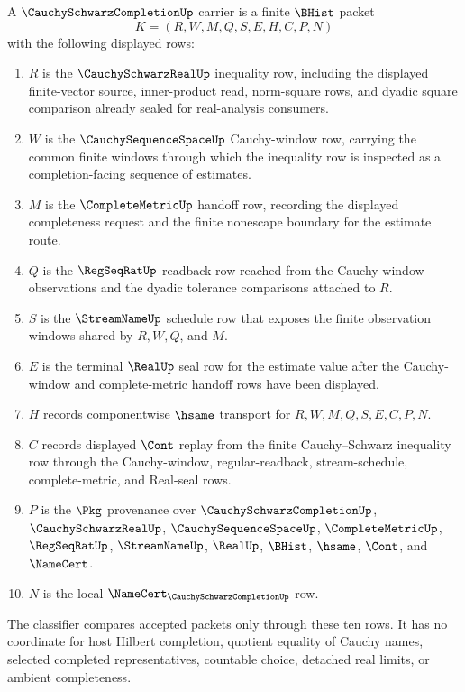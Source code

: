 \begin{definition}
\label{def:cauchy-schwarz-completion-carrier}
A $\CauchySchwarzCompletionUp$ carrier is a finite $\BHist$ packet
$$
K=(R,W,M,Q,S,E,H,C,P,N)
$$
with the following displayed rows:
\begin{enumerate}
\item $R$ is the $\CauchySchwarzRealUp$ inequality row, including the displayed finite-vector source, inner-product read, norm-square rows, and dyadic square comparison already sealed for real-analysis consumers.
\item $W$ is the $\CauchySequenceSpaceUp$ Cauchy-window row, carrying the common finite windows through which the inequality row is inspected as a completion-facing sequence of estimates.
\item $M$ is the $\CompleteMetricUp$ handoff row, recording the displayed completeness request and the finite nonescape boundary for the estimate route.
\item $Q$ is the $\RegSeqRatUp$ readback row reached from the Cauchy-window observations and the dyadic tolerance comparisons attached to $R$.
\item $S$ is the $\StreamNameUp$ schedule row that exposes the finite observation windows shared by $R,W,Q$, and $M$.
\item $E$ is the terminal $\RealUp$ seal row for the estimate value after the Cauchy-window and complete-metric handoff rows have been displayed.
\item $H$ records componentwise $\hsame$ transport for $R,W,M,Q,S,E,C,P,N$.
\item $C$ records displayed $\Cont$ replay from the finite Cauchy--Schwarz inequality row through the Cauchy-window, regular-readback, stream-schedule, complete-metric, and Real-seal rows.
\item $P$ is the $\Pkg$ provenance over $\CauchySchwarzCompletionUp$, $\CauchySchwarzRealUp$, $\CauchySequenceSpaceUp$, $\CompleteMetricUp$, $\RegSeqRatUp$, $\StreamNameUp$, $\RealUp$, $\BHist$, $\hsame$, $\Cont$, and $\NameCert$.
\item $N$ is the local $\NameCert_{\CauchySchwarzCompletionUp}$ row.
\end{enumerate}
The classifier compares accepted packets only through these ten rows. It has no coordinate for host Hilbert completion, quotient equality of Cauchy names, selected completed representatives, countable choice, detached real limits, or ambient completeness.
\end{definition}

